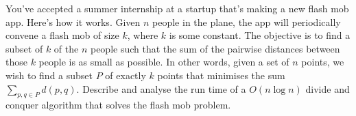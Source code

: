 \documentclass[12 pt, letterpaper]{hmcpset}
\begin{document}
\pagebreak

\begin{problem}
	You've accepted a summer internship at a startup that's making a new flash mob app. Here's how it works. Given $n$ people in the plane, the app will periodically convene a flash mob of size $k$, where $k$ is some constant. The objective is to find a subset of $k$ of the $n$ people such that the sum of the pairwise distances between those $k$ people is as small as possible. In other words, given a set of $n$ points, we wish to find a subset $P$ of exactly $k$ points that minimises the sum $\sum_{p, q \in P} d(p, q)$. Describe and analyse the run time of a $O(n \log n)$ divide and conquer algorithm that solves the flash mob problem.
\end{problem}
\end{document}
